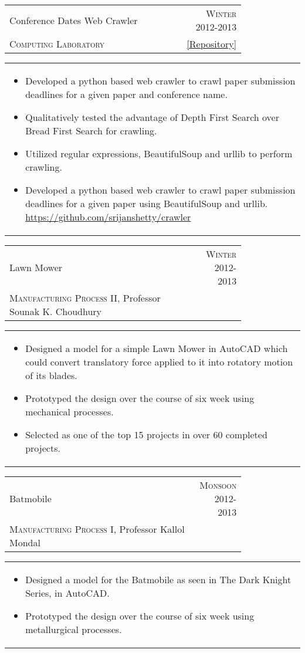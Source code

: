 \documentclass[a4paper,10pt]{article} %
\newcommand{\cproject}[5]{
    \begin{tabular}{p{0.80\linewidth}r}
        \textcolor{NavyBlue}{#2} & \multicolumn{1}{m{4cm}}{\raggedleft \textsc{#1}}\\
        #3 & #4
    \end{tabular}
    \begin{tabular}{p{\linewidth}}
    \vspace{-0.3cm}
        \footnotesize{#5}
    \end{tabular}
    \vspace{-0.5cm}
}
\newcommand{\lproject}[4]{
    \begin{tabular}{p{0.80\linewidth}r}
        \textcolor{NavyBlue}{#2} & \multicolumn{1}{m{4cm}}{\raggedleft \textsc{#1}}\\
        #3
    \end{tabular}
    \begin{tabular}{p{\linewidth}}
    \vspace{-0.3cm}
        \footnotesize{#4}
    \end{tabular}
    \vspace{-0.5cm}
}
\begin{document}
\cproject
    {Winter 2012-2013}
    {Conference Dates Web Crawler}
    {\textsc{Computing Laboratory}}
    {\href{https://github.com/srijanshetty/crawler} {\footnotesize{ [Repository]}} }
          {
              \begin{itemize}[leftmargin=0.5cm]
                   \item Developed a python based web crawler to crawl paper submission deadlines for a given paper and conference name.
                   \item Qualitatively tested the advantage of Depth First Search over Bread First Search for crawling.
                   \item Utilized regular expressions, BeautifulSoup and urllib to perform crawling.
                   \item Developed a python based web crawler to crawl paper submission deadlines for a given paper using BeautifulSoup and
                       urllib.
                   \href{https://github.com/srijanshetty/crawler} {https://github.com/srijanshetty/crawler}
              \end{itemize}

          }

\lproject {Winter 2012-2013}
          {Lawn Mower}
          {\textsc{Manufacturing Process II}, Professor Sounak K. Choudhury}
          {
               \begin{itemize}[leftmargin=0.5cm]
                   \item Designed a model for a simple Lawn Mower in AutoCAD which could convert translatory force applied to it
                       into rotatory motion of its blades.
                   \item Prototyped the design over the course of six week using mechanical processes.
                   \item Selected as one of the top 15 projects in over 60 completed projects.
               \end{itemize}
           }


\lproject {Monsoon 2012-2013}
          {Batmobile}
          {\textsc{Manufacturing Process I}, Professor Kallol Mondal}
          {
               \begin{itemize}[leftmargin=0.5cm]
                   \item Designed a model for the Batmobile as seen in The Dark Knight Series, in AutoCAD.
                   \item Prototyped the design over the course of six week using metallurgical processes.
               \end{itemize}
           }
\end{document}
